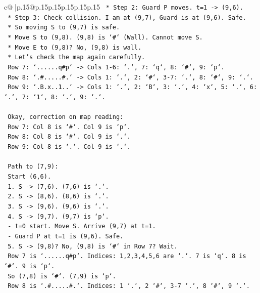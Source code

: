 \documentclass{article}
\begin{document}
{\begin{supertabular}{c@{$\;$}|p{.15\linewidth}@{}p{.15\linewidth}p{.15\linewidth}p{.15\linewidth}p{.15\linewidth}p{.15\linewidth}}
{{{\texttt{        *   Step 2: Guard P moves. t=1 {-}> (9,6).} \\
\texttt{        *   Step 3: Check collision. I am at (9,7), Guard is at (9,6). Safe.} \\
\texttt{        *   So moving S to (9,7) is safe.} \\
\texttt{    *   Move S to (9,8). (9,8) is `\#` (Wall). Cannot move S.} \\
\texttt{    *   Move E to (9,8)? No, (9,8) is wall.} \\
\texttt{    *   Let's check the map again carefully.} \\
\texttt{        Row 7: `......q\#p` {-}> Cols 1{-}6: `.`, 7: `q`, 8: `\#`, 9: `p`.} \\
\texttt{        Row 8: `.\#.....\#.` {-}> Cols 1: `.`, 2: `\#`, 3{-}7: `.`, 8: `\#`, 9: `.`.} \\
\texttt{        Row 9: `.B.x..1..` {-}> Cols 1: `.`, 2: `B`, 3: `.`, 4: `x`, 5: `.`, 6: `.`, 7: `1`, 8: `.`, 9: `.`.} \\
\\ 
\texttt{    Okay, correction on map reading:} \\
\texttt{    Row 7: Col 8 is `\#`. Col 9 is `p`.} \\
\texttt{    Row 8: Col 8 is `\#`. Col 9 is `.`.} \\
\texttt{    Row 9: Col 8 is `.`. Col 9 is `.`.} \\
\\ 
\texttt{    Path to (7,9):} \\
\texttt{    Start (6,6).} \\
\texttt{    1. S {-}> (7,6). (7,6) is `.`.} \\
\texttt{    2. S {-}> (8,6). (8,6) is `.`.} \\
\texttt{    3. S {-}> (9,6). (9,6) is `.`.} \\
\texttt{    4. S {-}> (9,7). (9,7) is `p`.} \\
\texttt{       {-} t=0 start. Move S. Arrive (9,7) at t=1.} \\
\texttt{       {-} Guard P at t=1 is (9,6). Safe.} \\
\texttt{    5. S {-}> (9,8)? No, (9,8) is `\#` in Row 7? Wait.} \\
\texttt{       Row 7 is `......q\#p`. Indices: 1,2,3,4,5,6 are `.`. 7 is `q`. 8 is `\#`. 9 is `p`.} \\
\texttt{       So (7,8) is `\#`. (7,9) is `p`.} \\
\texttt{       Row 8 is `.\#.....\#.`. Indices: 1 `.`, 2 `\#`, 3{-}7 `.`, 8 `\#`, 9 `.`.} \\
}}}
\end{supertabular}}
\end{document}
